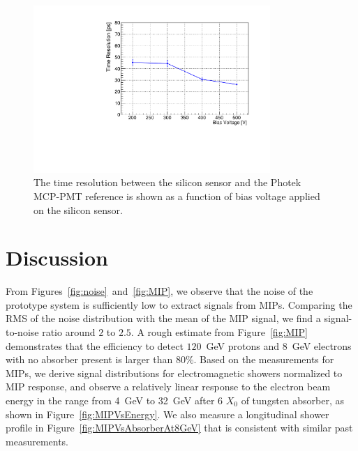 \documentclass[12pt]{article}
\begin{document}
{\begin{figure}[htbp] 
\centering
\includegraphics[width=0.8\textwidth]{plots/SigmaT_vs_DV_lin30Stamp.pdf} 
\caption{The time resolution between the silicon sensor and the Photek MCP-PMT 
reference is shown as a function of bias voltage applied on the silicon sensor. } 
\label{fig:SigmaT_vs_DV_lin30Stamp} 
\end{figure} 

\section{Discussion} 
\label{sec:discussion} 

From Figures~\ref{fig:noise}~and~\ref{fig:MIP}, we observe that the noise of the
prototype system is sufficiently low to extract signals from MIPs. Comparing the
RMS of the noise distribution with the mean of the MIP signal, we find a
signal-to-noise ratio around $2$ to $2.5$. A rough estimate from
Figure~\ref{fig:MIP} demonstrates that the efficiency to detect $120$~GeV
protons and $8$~GeV electrons with no absorber present is larger than $80\%$.
Based on the measurements for MIPs, we derive signal distributions for
electromagnetic showers normalized to MIP response, and observe a relatively
linear response to the electron beam energy in the range from 4~GeV to 32~GeV
after 6 $X_0$ of tungsten absorber, as shown in Figure~\ref{fig:MIPVsEnergy}. We also
measure a longitudinal shower profile in Figure~\ref{fig:MIPVsAbsorberAt8GeV}
that is consistent with similar past measurements.

}
\end{document}
